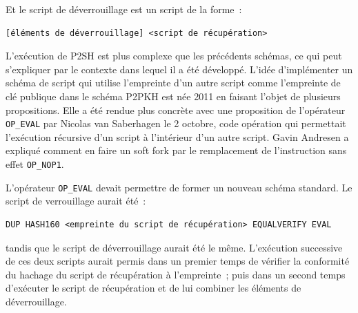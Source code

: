 Et le script de déverrouillage est un script de la forme~:

\begin{Verbatim}[fontsize=\small]
[éléments de déverrouillage] <script de récupération>
\end{Verbatim}

L'exécution de P2SH est plus complexe que les précédents schémas, ce qui peut s'expliquer par le contexte dans lequel il a été développé. L'idée d'implémenter un schéma de script qui utilise l'empreinte d'un autre script comme l'empreinte de clé publique dans le schéma P2PKH est née 2011 en faisant l'objet de plusieurs propositions. Elle a été rendue plus concrète avec une proposition de l'opérateur \texttt{OP\_EVAL} par Nicolas van Saberhagen le 2 octobre, code opération qui permettait l'exécution récursive d'un script à l'intérieur d'un autre script. Gavin Andresen a expliqué comment en faire un soft fork par le remplacement de l'instruction sans effet \texttt{OP\_NOP1}.

L'opérateur \texttt{OP\_EVAL} devait permettre de former un nouveau schéma standard. Le script de verrouillage aurait été~:

\begin{Verbatim}[fontsize=\small]
DUP HASH160 <empreinte du script de récupération> EQUALVERIFY EVAL
\end{Verbatim}

tandis que le script de déverrouillage aurait été le même. L'exécution successive de ces deux scripts aurait permis dans un premier temps de vérifier la conformité du hachage du script de récupération à l'empreinte~; puis dans un second temps d'exécuter le script de récupération et de lui combiner les éléments de déverrouillage.

